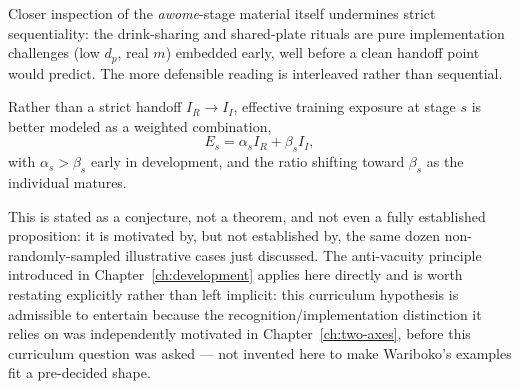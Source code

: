 Closer inspection of the \emph{awome}-stage material itself undermines strict sequentiality: the drink-sharing and shared-plate rituals are pure implementation challenges (low $d_p$, real $m$) embedded early, well before a clean handoff point would predict. The more defensible reading is interleaved rather than sequential.

\begin{repairbox}
\begin{conjecture}
Rather than a strict handoff $I_R \to I_I$, effective training exposure at stage $s$ is better modeled as a weighted combination,
\[
E_s = \alpha_s I_R + \beta_s I_I,
\]
with $\alpha_s > \beta_s$ early in development, and the ratio shifting toward $\beta_s$ as the individual matures.
\end{conjecture}

This is stated as a conjecture, not a theorem, and not even a fully established proposition: it is motivated by, but not established by, the same dozen non-randomly-sampled illustrative cases just discussed. The anti-vacuity principle introduced in Chapter~\ref{ch:development} applies here directly and is worth restating explicitly rather than left implicit: this curriculum hypothesis is admissible to entertain because the recognition/implementation distinction it relies on was independently motivated in Chapter~\ref{ch:two-axes}, before this curriculum question was asked --- not invented here to make Wariboko's examples fit a pre-decided shape.
\end{repairbox}
